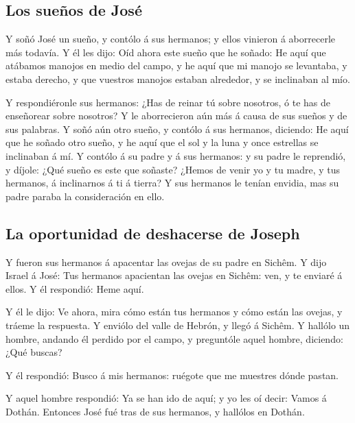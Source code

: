 \hypertarget{los-sueuxf1os-de-josuxe9}{%
\subsection{Los sueños de José}\label{los-sueuxf1os-de-josuxe9}}

 Y soñó José un sueño, y contólo á sus hermanos; y ellos
vinieron á aborrecerle más todavía.  Y él les dijo: Oíd
ahora este sueño que he soñado:  He aquí que atábamos
manojos en medio del campo, y he aquí que mi manojo se levantaba, y
estaba derecho, y que vuestros manojos estaban alrededor, y se
inclinaban al mío.

 Y respondiéronle sus hermanos: ¿Has de reinar tú sobre
nosotros, ó te has de enseñorear sobre nosotros? Y le aborrecieron aún
más á causa de sus sueños y de sus palabras.  Y soñó aún
otro sueño, y contólo á sus hermanos, diciendo: He aquí que he soñado
otro sueño, y he aquí que el sol y la luna y once estrellas se
inclinaban á mí.  Y contólo á su padre y á sus hermanos: y
su padre le reprendió, y díjole: ¿Qué sueño es este que soñaste? ¿Hemos
de venir yo y tu madre, y tus hermanos, á inclinarnos á ti á tierra?
 Y sus hermanos le tenían envidia, mas su padre paraba la
consideración en ello.

\hypertarget{la-oportunidad-de-deshacerse-de-joseph}{%
\subsection{La oportunidad de deshacerse de
Joseph}\label{la-oportunidad-de-deshacerse-de-joseph}}

 Y fueron sus hermanos á apacentar las ovejas de su padre
en Sichêm.  Y dijo Israel á José: Tus hermanos apacientan
las ovejas en Sichêm: ven, y te enviaré á ellos. Y él respondió: Heme
aquí.

 Y él le dijo: Ve ahora, mira cómo están tus hermanos y
cómo están las ovejas, y tráeme la respuesta. Y enviólo del valle de
Hebrón, y llegó á Sichêm.  Y hallólo un hombre, andando él
perdido por el campo, y preguntóle aquel hombre, diciendo: ¿Qué buscas?

 Y él respondió: Busco á mis hermanos: ruégote que me
muestres dónde pastan.

 Y aquel hombre respondió: Ya se han ido de aquí; y yo les
oí decir: Vamos á Dothán. Entonces José fué tras de sus hermanos, y
hallólos en Dothán.

